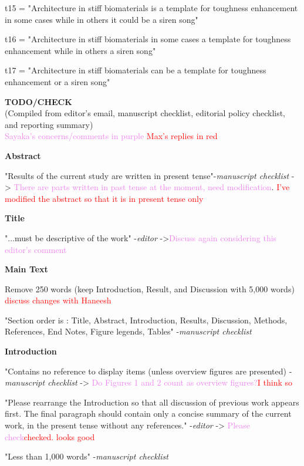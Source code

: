 \documentclass[11pt,letterpaper]{report}
\newcommand{\cmark}{\ding{51}}%
\newcommand{\done}{\rlap{$\square$}{\raisebox{2pt}{\large\hspace{1pt}\cmark}}%
\hspace{-2.5pt}}
\begin{document}
t15 = "Architecture in stiff biomaterials is a template for toughness enhancement in some cases while in others it could be a siren song"

t16 = "Architecture in stiff biomaterials in some cases a template for toughness enhancement while in others a siren song"

t17 = "Architecture in stiff biomaterials can be  a template for toughness enhancement or a siren song"





\newpage
\textbf{TODO/CHECK}\\
(Compiled from editor's email, manuscript checklist, editorial policy checklist, and reporting summary)\\
\textcolor{violet}{Sayaka's concerns/comments in purple}
\textcolor{red}{Max's replies in red}


\textbf{Abstract}
\begin{todolist}
\item[\done] "Results of the current study are written in present tense"-\textit{manuscript checklist} -> \textcolor{violet}{There are parts written in past tense at the moment, need modification}. \textcolor{red}{I've modified the abstract so that it is in present tense only}
\end{todolist}

\textbf{Title}
\begin{todolist}
\item[\done] "...must be descriptive of the work" -\textit{editor} ->\textcolor{violet}{Discuss again considering this editor's comment}
\end{todolist}


\textbf{Main Text}
\begin{todolist}
\item[\done] Remove 250 words (keep Introduction, Result, and Discussion with 5,000 words) \textcolor{red}{discuss changes with Haneesh}
\item[\done]"Section order is : Title, Abstract, Introduction, Results, Discussion, Methods, References, End Notes, Figure legends, Tables" -\textit{manuscript checklist}
\end{todolist}

\textbf{Introduction}
\begin{todolist}
\item[\done] "Contains no reference to display items (unless overview figures are presented) -\textit{manuscript checklist}
-> \textcolor{violet}{Do Figures 1 and 2 count as overview figures?}\textcolor{red}{I think so}
\item[\done] "Please rearrange the Introduction so that all discussion of previous work appears first. The final paragraph should contain only a concise summary of the current work, in the present tense without any references." -\textit{editor} -> \textcolor{violet}{Please check}\textcolor{red}{checked. looks good}
\item[\done] "Less than 1,000 words" -\textit{manuscript checklist}
\end{todolist}
\end{document}
